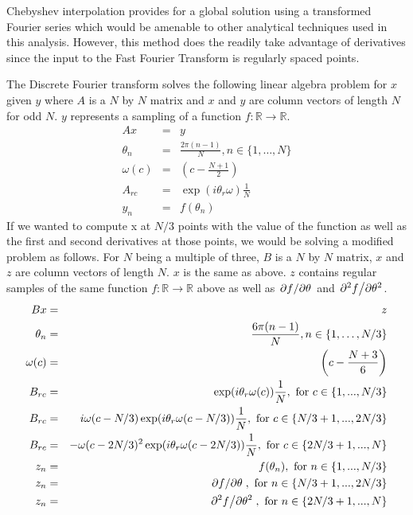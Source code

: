 \documentclass[11pt]{article} %
\begin{document}
Chebyshev interpolation provides for a global solution using a transformed Fourier series which would be amenable to other analytical techniques used in this analysis. However, this method does the readily take advantage of derivatives since the input to the Fast Fourier Transform is regularly spaced points.

The Discrete Fourier transform solves the following linear algebra problem for $ x $ given $ y $ where $ A $ is a $ N $ by $ N $ matrix and $ x $ and $ y $ are column vectors of length $ N $ for odd $ N $. $ y $ represents a sampling of a function $ f: \mathbb{R} \rightarrow \mathbb{R} $.
\begin{eqnarray}
Ax & = & y \\
\theta_n & = & \frac{2\pi (n -1)}{N}, n \in \{1, \hdots, N\} \\
\omega(c) & = & \left(c-\frac{N+1}{2} \right) \\
A_{rc} & = &  \exp(i\theta_r \omega) \frac{1}{N} \\
y_n & = & f(\theta_n)
\end{eqnarray}
If we wanted to compute x at $ N / 3 $  points with the value of the function as well as the first and second derivatives at those points, we would be solving a modified problem as follows. For $ N $ being a multiple of three, $ B $ is a $ N $ by $ N $ matrix, $ x $  and $ z $ are column vectors of length $ N $. $ x $  is the same as above. $ z $ contains regular samples of the same function  $ f: \mathbb{R} \rightarrow \mathbb{R} $ above as well as $ \pdv*{f}{\theta} $ and $ \pdv*[2]{f}{\theta} $.
\begin{eqnarray}
Bx & = & z \\
\theta_n & = & \frac{6\pi (n -1)}{N}, n \in \{1, \hdots, N/3\} \\
\omega(c) & = & \left(c-\frac{N+3}{6} \right) \\
B_{rc} & = & \exp(i\theta_r \omega(c) ) \frac{1}{N}, \mbox{ for } c \in \{1,...,N/3\} \\
B_{rc} & = & i\omega(c-N/3)\exp(i\theta_r \omega(c-N/3) ) \frac{1}{N}, \mbox{ for }  c \in \{N/3+1,...,2N/3\} \\
B_{rc} & = & -\omega(c-2N/3)^2\exp(i\theta_r \omega(c-2N/3) ) \frac{1}{N}, \mbox{ for }  c \in \{2N/3+1,...,N\} \\
z_n & = & f(\theta_n), \mbox{ for }  n \in \{1,...,N/3\} \\
z_n & = & \pdv*{f}{\theta} (\theta_{n-N/3}), \mbox{ for }  n \in \{N/3+1,...,2N/3\} \\
z_n & = & \pdv*[2]{f}{\theta} (\theta_{n-2N/3}), \mbox{ for }   n \in \{2N/3+1,...,N\} 
\end{eqnarray}
\end{document}
